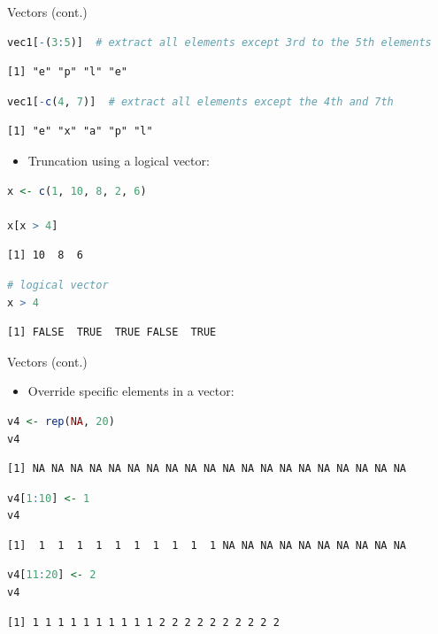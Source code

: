 \begin{frame}[fragile]{Vectors (cont.)}
\begin{lstlisting}[language=R]
vec1[-(3:5)]  # extract all elements except 3rd to the 5th elements
\end{lstlisting}
\begin{lstlisting}[style=output]
[1] "e" "p" "l" "e"
\end{lstlisting}
\begin{lstlisting}[language=R]
vec1[-c(4, 7)]  # extract all elements except the 4th and 7th
\end{lstlisting}
\begin{lstlisting}[style=output]
[1] "e" "x" "a" "p" "l"
\end{lstlisting}
\begin{itemize}
  \item Truncation using a logical vector:
\end{itemize}
\begin{lstlisting}[language=R]
x <- c(1, 10, 8, 2, 6)

x[x > 4]
\end{lstlisting}
\begin{lstlisting}[style=output]
[1] 10  8  6
\end{lstlisting}
\begin{lstlisting}[language=R]
# logical vector
x > 4
\end{lstlisting}
\begin{lstlisting}[style=output]
[1] FALSE  TRUE  TRUE FALSE  TRUE
\end{lstlisting}
\end{frame}

\begin{frame}[fragile]{Vectors (cont.)}
\begin{itemize}
  \item Override specific elements in a vector:
\end{itemize}
\begin{lstlisting}[language=R]
v4 <- rep(NA, 20)
v4
\end{lstlisting}
\begin{lstlisting}[style=output]
 [1] NA NA NA NA NA NA NA NA NA NA NA NA NA NA NA NA NA NA NA NA
\end{lstlisting}
\begin{lstlisting}[language=R]
v4[1:10] <- 1
v4
\end{lstlisting}
\begin{lstlisting}[style=output]
 [1]  1  1  1  1  1  1  1  1  1  1 NA NA NA NA NA NA NA NA NA NA
\end{lstlisting}
\begin{lstlisting}[language=R]
v4[11:20] <- 2
v4
\end{lstlisting}
\begin{lstlisting}[style=output]
 [1] 1 1 1 1 1 1 1 1 1 1 2 2 2 2 2 2 2 2 2 2
\end{lstlisting}
\end{frame}

